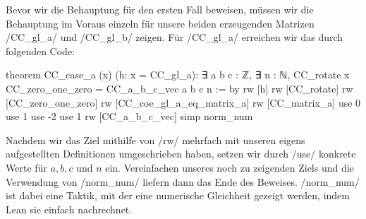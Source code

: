 \documentclass[10pt]{article}
\begin{document}
\noindent Bevor wir die Behauptung für den ersten Fall beweisen, müssen wir die Behauptung im Voraus einzeln für unsere beiden erzeugenden Matrizen \lean/CC_gl_a/ und \lean/CC_gl_b/ zeigen. Für \lean/CC_gl_a/ erreichen wir das durch folgenden Code:\par
\vspace{-0.15cm}
\hspace{-0.6cm}
\begin{minipage}{11cm}
\begin{leancode}
theorem CC_case_a (x) (h: x = CC_gl_a): ∃ a b c : ℤ, 
∃ n : ℕ, CC_rotate x CC_zero_one_zero 
        = CC_a_b_c_vec a b c n := by
    rw [h]
    rw [CC_rotate]
    rw [CC_zero_one_zero]
    rw [CC_coe_gl_a_eq_matrix_a]
    rw [CC_matrix_a]
    use 0
    use 1
    use -2
    use 1
    rw [CC_a_b_c_vec]
    simp
    norm_num
\end{leancode}
\end{minipage}
\begin{minipage}{5.5cm}
\noindent Nachdem wir das Ziel mithilfe von \lean/rw/ mehrfach mit unseren eigens aufgestellten Definitionen umgeschrieben haben, setzen wir durch \lean/use/ konkrete Werte für $a,b,c$ und $n$ ein. Vereinfachen unseres noch zu zeigenden Ziels und die Verwendung von \lean/norm_num/ liefern dann das Ende des Beweises. \lean/norm_num/ ist dabei eine Taktik, mit der eine numerische Gleichheit gezeigt werden, indem Lean sie einfach nachrechnet.
\end{minipage}\\
\end{document}
